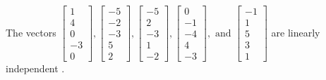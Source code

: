 \begin{exercise}
\begin{exerciseStatement}
  \end{exerciseStatement}
  \begin{exerciseAnswer}
   The vectors \(\left[\begin{array}{r}
1 \\
4 \\
0 \\
-3 \\
0
\end{array}\right] , \left[\begin{array}{r}
-5 \\
-2 \\
-3 \\
5 \\
2
\end{array}\right] , \left[\begin{array}{r}
-5 \\
2 \\
-3 \\
1 \\
-2
\end{array}\right] , \left[\begin{array}{r}
0 \\
-1 \\
-4 \\
4 \\
-3
\end{array}\right] , \text{ and } \left[\begin{array}{r}
-1 \\
1 \\
5 \\
3 \\
1
\end{array}\right]\) are 
  	 linearly independent  .
  


  \end{exerciseAnswer}
\end{exercise}